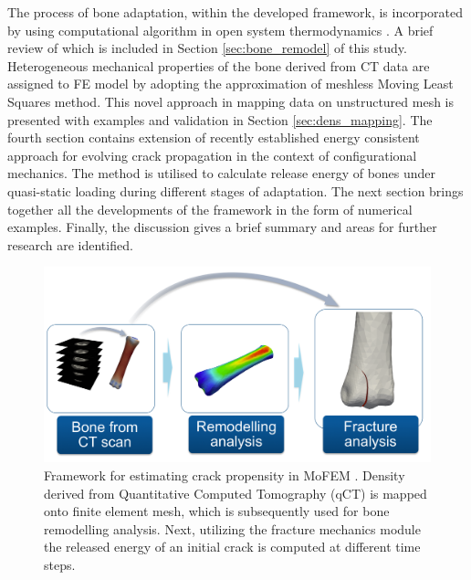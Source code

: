 \documentclass[11pt]{ACMEarticle}
\numberwithin{equation}{section}
\begin{document}
The process of bone adaptation, within the developed framework, is incorporated by using computational algorithm in open system thermodynamics \citep{Kuhl2003a}. A brief review of which is included in Section \ref{sec:bone_remodel} of this study. Heterogeneous mechanical properties of the bone derived from CT data are assigned to FE model by adopting the approximation of meshless Moving Least Squares method. This novel approach in mapping data on unstructured mesh is presented with examples and validation in Section \ref{sec:dens_mapping}. The fourth section contains extension of recently established energy consistent approach for evolving crack propagation in the context of configurational mechanics. The method is utilised to calculate release energy of bones under quasi-static loading during different stages of adaptation. The next section brings together all the developments of the framework in the form of numerical examples. Finally, the discussion gives a brief summary and areas for further research are identified.
\begin{figure}[h!]
	\begin{centering}
		\includegraphics[width=12cm]{Figures/framework}
		\caption{Framework for estimating crack propensity in MoFEM \citep{mofem2017}. Density derived from Quantitative Computed Tomography (qCT) is mapped onto finite element mesh, which is subsequently used for bone remodelling analysis. Next, utilizing the fracture mechanics module the released energy of an initial crack is computed at different time steps.}
		\label{fig:framework}
	\end{centering}
\end{figure}
\end{document}
